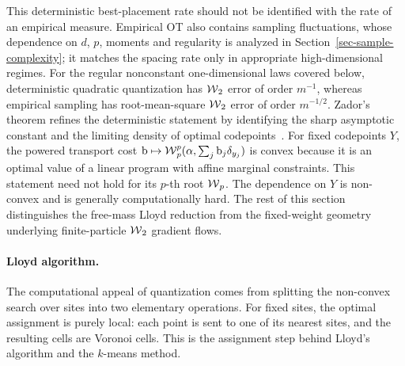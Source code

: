 This deterministic best-placement rate should not be identified with the rate of an empirical measure. Empirical OT also contains sampling fluctuations, whose dependence on $d$, $p$, moments and regularity is analyzed in Section~\ref{sec-sample-complexity}; it matches the spacing rate only in appropriate high-dimensional regimes. For the regular nonconstant one-dimensional laws covered below, deterministic quadratic quantization has $\operatorname{\mathcal{W}}_2$ error of order $m^{-1}$, whereas empirical sampling has root-mean-square $\operatorname{\mathcal{W}}_2$ error of order $m^{-1/2}$. Zador's theorem refines the deterministic statement by identifying the sharp asymptotic constant and the limiting density of optimal codepoints~\cite{graf2000foundationsquantization}.
For fixed codepoints $Y$, the powered transport cost
\(
\mathrm{b}\mapsto\operatorname{\mathcal{W}}_p^p(\alpha,\sum_j\mathrm{b}_j\delta_{y_j})
\)
is convex because it is an optimal value of a linear program with affine marginal constraints. This statement need not hold for its $p$-th root $\operatorname{\mathcal{W}}_p$. The dependence on $Y$ is non-convex and is generally computationally hard. The rest of this section distinguishes the free-mass Lloyd reduction from the fixed-weight geometry underlying finite-particle $\operatorname{\mathcal{W}}_2$ gradient flows.

\paragraph{Lloyd algorithm.}
The computational appeal of quantization comes from splitting the non-convex search over sites into two elementary operations. For fixed sites, the optimal assignment is purely local: each point is sent to one of its nearest sites, and the resulting cells are Voronoi cells. This is the assignment step behind Lloyd's algorithm and the $k$-means method.


